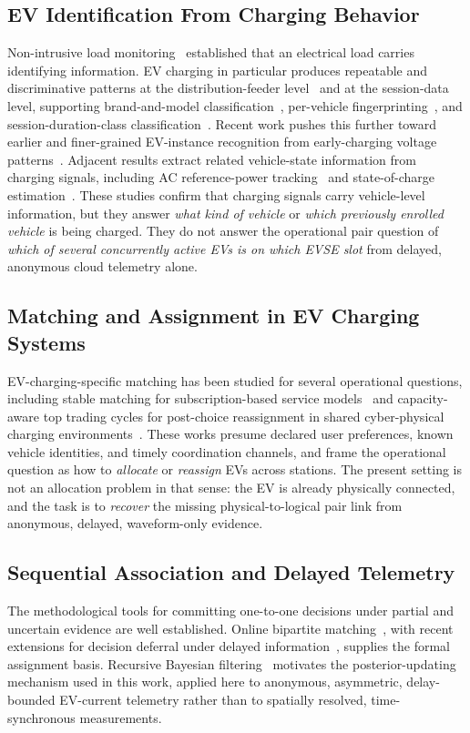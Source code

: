 \documentclass{ieeeaccess}
\begin{document}
    \subsection{EV Identification From Charging Behavior}
    Non-intrusive load monitoring~\cite{bhart} established that an electrical load carries identifying information.
    EV charging in particular produces repeatable and discriminative patterns at the distribution-feeder level~\cite{b9} and at the session-data level, supporting brand-and-model classification~\cite{b10}, per-vehicle fingerprinting~\cite{b11}, and session-duration-class classification~\cite{b12}.
    Recent work pushes this further toward earlier and finer-grained EV-instance recognition from early-charging voltage patterns~\cite{bmarchiori25}.
    Adjacent results extract related vehicle-state information from charging signals, including AC reference-power tracking~\cite{bferretti24} and state-of-charge estimation~\cite{b20,b21}.
    These studies confirm that charging signals carry vehicle-level information, but they answer \emph{what kind of vehicle} or \emph{which previously enrolled vehicle} is being charged.
    They do not answer the operational pair question of \emph{which of several concurrently active EVs is on which EVSE slot} from delayed, anonymous cloud telemetry alone.

    \subsection{Matching and Assignment in EV Charging Systems}
    EV-charging-specific matching has been studied for several operational questions, including stable matching for subscription-based service models~\cite{bkhanda} and capacity-aware top trading cycles for post-choice reassignment in shared cyber-physical charging environments~\cite{breactttc}.
    These works presume declared user preferences, known vehicle identities, and timely coordination channels, and frame the operational question as how to \emph{allocate} or \emph{reassign} EVs across stations.
    The present setting is not an allocation problem in that sense: the EV is already physically connected, and the task is to \emph{recover} the missing physical-to-logical pair link from anonymous, delayed, waveform-only evidence.

    \subsection{Sequential Association and Delayed Telemetry}
    The methodological tools for committing one-to-one decisions under partial and uncertain evidence are well established.
    Online bipartite matching~\cite{b17,b18}, with recent extensions for decision deferral under delayed information~\cite{bemek16}, supplies the formal assignment basis.
    Recursive Bayesian filtering~\cite{b19,bsarkka} motivates the posterior-updating mechanism used in this work, applied here to anonymous, asymmetric, delay-bounded EV-current telemetry rather than to spatially resolved, time-synchronous measurements.
\end{document}
